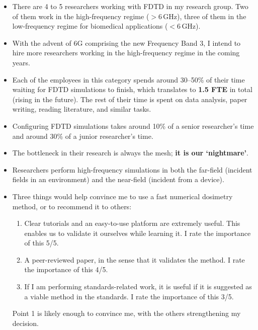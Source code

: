 \documentclass[11pt]{article}
\begin{document}
\medskip
\begin{itemize}[leftmargin=1.4em,itemsep=0.5em]

  \item There are 4 to 5 researchers working with FDTD in my research group. Two of them work
  in the high-frequency regime ($>6$\,GHz), three of them in the low-frequency regime for
  biomedical applications ($<6$\,GHz).

  \item With the advent of 6G comprising the new Frequency Band 3, I intend to hire more
  researchers working in the high-frequency regime in the coming years.

  \item Each of the employees in this category spends around 30--50\% of their time waiting
  for FDTD simulations to finish, which translates to \textbf{1.5 FTE} in total (rising in the future).
  The rest of their time is spent on data analysis, paper writing, reading literature, and
  similar tasks.

  \item Configuring FDTD simulations takes around 10\% of a senior researcher's time and
  around 30\% of a junior researcher's time.

  \item The bottleneck in their research is always the mesh; \textbf{it is our `nightmare'}.

  \item Researchers perform high-frequency simulations in both the far-field (incident fields
  in an environment) and the near-field (incident from a device).

  \item Three things would help convince me to use a fast numerical dosimetry method, or to
  recommend it to others:
  \begin{enumerate}[leftmargin=1.6em,topsep=0.3em,itemsep=0.2em]
    \item Clear tutorials and an easy-to-use platform are extremely useful. This enables us to
    validate it ourselves while learning it. I rate the importance of this 5/5.
    \item A peer-reviewed paper, in the sense that it validates the method. I rate the
    importance of this 4/5.
    \item If I am performing standards-related work, it is useful if it is suggested as a
    viable method in the standards. I rate the importance of this 3/5.
  \end{enumerate}
  Point 1 is likely enough to convince me, with the others strengthening my decision.


\end{itemize}
\end{document}
